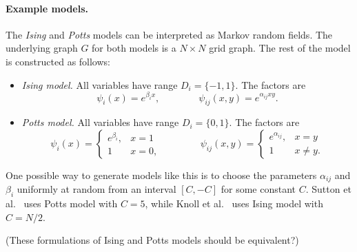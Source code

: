 \documentclass[11pt,a4paper]{article}
\theoremstyle{remark}
\newcommand{\range}{D}
\begin{document}
\paragraph{Example models.} The \emph{Ising} and \emph{Potts} models can be interpreted as Markov random fields. The underlying graph $G$ for both models is a $N \times N$ grid graph. The rest of the model is constructed as follows:
\begin{itemize}
    \item \emph{Ising model.} All variables have range $\range_{i} = \{ -1, 1 \}$. The factors are
    \begin{equation*}
        \psi_i(x) = e^{\beta_{i} x}, \qquad\qquad
        \psi_{ij}(x,y) = e^{\alpha_{ij}xy}.
    \end{equation*}
    \item \emph{Potts model.} All variables have range $\range_{i} = \{ 0, 1 \}$. The factors are
    \begin{equation*}
        \psi_i(x) = \begin{cases} e^{\beta_{i}}, & x = 1 \\1 & x = 0, \end{cases} \qquad\qquad
        \psi_{ij}(x,y) = \begin{cases} e^{\alpha_{ij}}, & x = y \\1 & x \ne y. \end{cases}
    \end{equation*}
\end{itemize}
One possible way to generate models like this is to choose the parameters $\alpha_{ij}$ and $\beta_i$ uniformly at random from an interval $[C, -C]$ for some constant $C$. Sutton et al.~\cite{Sutton:2007:IDS:3020488.3020534} uses Potts model with $C = 5$, while Knoll et al.~\cite{10.1007/978-3-319-23525-7_18} uses Ising model with $C = N/2$.

(These formulations of Ising and Potts models should be equivalent?)
\end{document}
